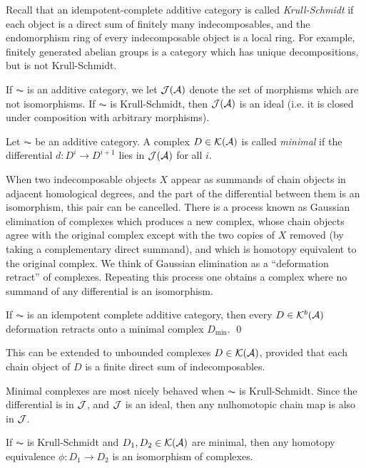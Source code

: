 Recall that an idempotent-complete additive category is called \emph{Krull-Schmidt} if each object is a direct sum of finitely many indecomposables, and the endomorphism ring of every indecomposable object is a local  ring. For example, finitely generated abelian groups is a category which has unique decompositions, but is not Krull-Schmidt.


If $\AC$ is an additive category, we let ${\mathcal{J}}({\mathcal{A}})$ denote the set of morphisms which are not isomorphisms.  If $\AC$ is Krull-Schmidt, then ${\mathcal{J}}({\mathcal{A}})$ is an ideal (i.e. it is closed under composition with arbitrary morphisms).

\begin{definition}\label{def:minimalCx}
Let $\AC$ be an additive category.  A complex $D\in {\mathcal{K}}({\mathcal{A}})$ is called \emph{minimal} if the differential $d:D^i\rightarrow D^{i+1}$ lies in ${\mathcal{J}}({\mathcal{A}})$ for all $i$.
\end{definition}

When two indecomposable objects $X$ appear as summands of chain objects in adjacent homological degrees, and the part of the differential between them is an isomorphism, this pair can be
cancelled. There is a process known as Gaussian elimination of complexes \cite{DBNfast} which produces a new complex, whose chain objects agree with the original complex except with the
two copies of $X$ removed (by taking a complementary direct summand), and which is homotopy equivalent to the original complex. We think of Gaussian elimination as a ``deformation
retract'' of complexes. Repeating this process one obtains a complex where no summand of any differential is an isomorphism.

\begin{proposition}\label{prop:minimalCx1}
If $\AC$ is an idempotent complete additive category, then every $D\in {\mathcal{K}}^b({\mathcal{A}})$ deformation retracts onto a minimal complex $D_{\min}$. \qed
\end{proposition}

\begin{remark}
This can be extended to unbounded complexes $D\in {\mathcal{K}}({\mathcal{A}})$, provided that each chain object of $D$ is a finite direct sum of indecomposables.
\end{remark}

Minimal complexes are most nicely behaved when $\AC$ is Krull-Schmidt. Since the differential is in ${\mathcal{J}}$, and ${\mathcal{J}}$ is an ideal, then any nulhomotopic chain map is also in ${\mathcal{J}}$.

\begin{lemma}\label{lem:minimalCxIso}
If $\AC$ is Krull-Schmidt and $D_1,D_2\in {\mathcal{K}}({\mathcal{A}})$ are minimal, then any homotopy equivalence $\phi:D_1\rightarrow D_2$ is an isomorphism of complexes.
\end{lemma}

